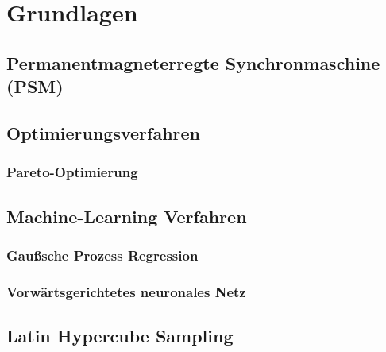 
\chapter{Grundlagen}
\section{Permanentmagneterregte Synchronmaschine (PSM)}

\section{Optimierungsverfahren}
\subsection{Pareto-Optimierung}

\section{Machine-Learning Verfahren}
\subsection{Gaußsche Prozess Regression}
\subsection{Vorwärtsgerichtetes neuronales Netz}

\section{Latin Hypercube Sampling}
